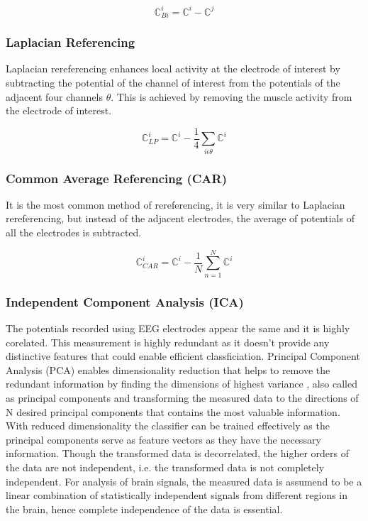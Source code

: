 \begin{equation} \label{eq:bip_eeg}
    \mathbb{C}^{i}_{Bi} =  \mathbb{C}^{i} - \mathbb{C}^{j}
\end{equation}

\subsubsection{Laplacian Referencing}
Laplacian rereferencing enhances local activity at the electrode of interest by subtracting the potential of the channel of interest from the potentials of the adjacent 
four channels $\theta$. This is achieved by removing the muscle activity from the electrode of interest.

\begin{equation} \label{eq:lap_eeg}
    \mathbb{C}^{i}_{LP} =  \mathbb{C}^{i} - \frac{1}{4} \sum_{i \epsilon \theta} \mathbb{C}^{i}
\end{equation}

\subsubsection{Common Average Referencing (CAR)}
It is the most common method of rereferencing, it is very similar to Laplacian rereferencing, but instead of the adjacent electrodes, the average of potentials of all the electrodes
is subtracted.

\begin{equation} \label{eq:car_eeg}
    \mathbb{C}^{i}_{CAR} =  \mathbb{C}^{i} - \frac{1}{N} \sum_{n = 1}^{N} \mathbb{C}^{i}
\end{equation}

\subsubsection{Independent Component Analysis (ICA)}
The potentials recorded using EEG electrodes appear the same and it is highly corelated. This measurement is highly redundant as it doesn't provide any distinctive features that could
enable efficient classficiation. Principal Component Analysis (PCA) enables dimensionality reduction that helps to remove the redundant information by finding the dimensions of highest variance
, also called as principal components and transforming the measured data to the directions of N desired principal components that contains the most valuable information. With reduced dimensionality
the classifier can be trained effectively as the principal components serve as feature vectors as they have the necessary information. Though the transformed data is decorrelated, the higher orders 
of the data are not independent, i.e. the transformed data is not completely independent. For analysis of brain signals, the measured data is assumend to be a linear combination of statistically
independent signals from different regions in the brain, hence complete independence of the data is essential.

